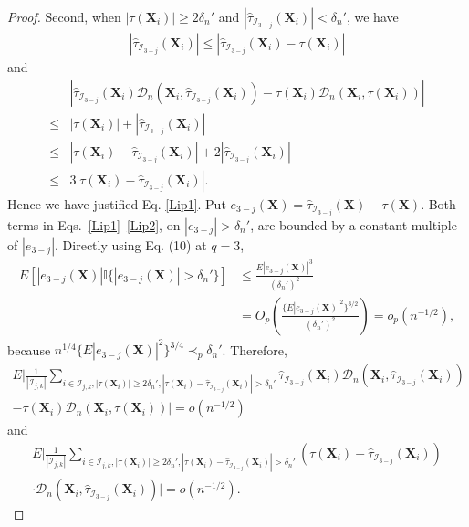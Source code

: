 \documentclass[11pt]{article}
\theoremstyle{referenceplain}
\theoremstyle{referencedefinition}
\theoremstyle{referenceremark}
\begin{document}
\begin{proof}
Second, when $|\tau(\mathbf{X}_i)|\ge 2\delta_n'$ and $|\widehat{\tau}_{\mathcal{I}_{3-j}}(\mathbf{X}_i)|< \delta_n'$, we have
\begin{align*}
    |\widehat{\tau}_{\mathcal{I}_{3-j}}(\mathbf{X}_i)|\leq |\widehat{\tau}_{\mathcal{I}_{3-j}}(\mathbf{X}_i)-\tau(\mathbf{X}_i)|
\end{align*}
and
\begin{align*}
    &\left|\widehat{\tau}_{\mathcal{I}_{3-j}}(\mathbf{X}_i)\mathcal{D}_n(\mathbf{X}_i,\widehat{\tau}_{\mathcal{I}_{3-j}}(\mathbf{X}_i)) -\tau(\mathbf{X}_i)\mathcal{D}_n(\mathbf{X}_i,\tau(\mathbf{X}_i))\right|\\
    \leq&|\tau(\mathbf{X}_i)|+|\widehat{\tau}_{\mathcal{I}_{3-j}}(\mathbf{X}_i)|\\
    \leq& |\tau(\mathbf{X}_i)-\widehat{\tau}_{\mathcal{I}_{3-j}}(\mathbf{X}_i)|+2|\widehat{\tau}_{\mathcal{I}_{3-j}}(\mathbf{X}_i)|\\
    \leq& 3|\tau(\mathbf{X}_i)-\widehat{\tau}_{\mathcal{I}_{3-j}}(\mathbf{X}_i)|.
\end{align*}
Hence we have justified Eq. \eqref{Lip1}. Put
$e_{3-j}(\mathbf{X})=\widehat{\tau}_{\mathcal{I}_{3-j}}(\mathbf{X})-\tau(\mathbf{X})$.
Both terms in Eqs.~\eqref{Lip1}--\eqref{Lip2}, on $|e_{3-j}|>\delta_n'$, are bounded by a constant multiple of $|e_{3-j}|$. Directly using Eq. (10) at $q=3$,
\begin{align*}
E[|e_{3-j}(\mathbf{X})|\mathbb{I}\{|e_{3-j}(\mathbf{X})|>\delta_n'\}]
&\leq \frac{E|e_{3-j}(\mathbf{X})|^3}{(\delta_n')^2}\\
&=O_p\left(\frac{\{E|e_{3-j}(\mathbf{X})|^2\}^{3/2}}{(\delta_n')^2}\right)=o_p(n^{-1/2}),
\end{align*}
because $n^{1/4}\{E|e_{3-j}(\mathbf{X})|^2\}^{3/4}\prec_p\delta_n'$.
Therefore, 
    \begin{align*}
        E\bigg|\frac{1}{|\mathcal{I}_{j,k}|}\sum_{i\in\mathcal{I}_{j,k},|\tau(\mathbf{X}_i)|\ge2\delta_n',|\tau(\mathbf{X}_i)-\widehat{\tau}_{\mathcal{I}_{3-j}}(\mathbf{X}_i)|>\delta_n'}\widehat{\tau}_{\mathcal{I}_{3-j}}(\mathbf{X}_i)\mathcal{D}_n(\mathbf{X}_i,\widehat{\tau}_{\mathcal{I}_{3-j}}(\mathbf{X}_i)) \\-\tau(\mathbf{X}_i)\mathcal{D}_n(\mathbf{X}_i,\tau(\mathbf{X}_i))\bigg|=o(n^{-1/2})
    \end{align*}
    and
    \begin{align*}
        E\bigg|\frac{1}{|\mathcal{I}_{j,k}|}\sum_{i\in\mathcal{I}_{j,k},|\tau(\mathbf{X}_i)|\ge2\delta_n',|\tau(\mathbf{X}_i)-\widehat{\tau}_{\mathcal{I}_{3-j}}(\mathbf{X}_i)|>\delta_n'}(\tau(\mathbf{X}_i)-\widehat{\tau}_{\mathcal{I}_{3-j}}(\mathbf{X}_i))\\\cdot\mathcal{D}_n(\mathbf{X}_i,\widehat{\tau}_{\mathcal{I}_{3-j}}(\mathbf{X}_i))\bigg|=o(n^{-1/2}).

\end{align*}
\end{proof}
\end{document}
